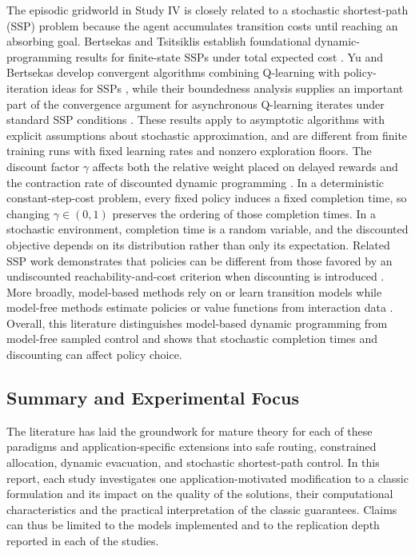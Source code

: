 \documentclass{ai-lab-report}
\begin{document}
The episodic gridworld in Study IV is closely related to a stochastic shortest-path (SSP) problem because the agent accumulates transition costs until reaching an absorbing goal. Bertsekas and Tsitsiklis establish foundational dynamic-programming results for finite-state SSPs under total expected cost \citep{bertsekas1991ssp}. Yu and Bertsekas develop convergent algorithms combining Q-learning with policy-iteration ideas for SSPs \citep{yu2013qlearning}, while their boundedness analysis supplies an important part of the convergence argument for asynchronous Q-learning iterates under standard SSP conditions \citep{yu2013boundedness}. These results apply to asymptotic algorithms with explicit assumptions about stochastic approximation, and are different from finite training runs with fixed learning rates and nonzero exploration floors. The discount factor $\gamma$ affects both the relative weight placed on delayed rewards and the contraction rate of discounted dynamic programming \citep{sutton2018rl}. In a deterministic constant-step-cost problem, every fixed policy induces a fixed completion time, so changing $\gamma \in (0,1)$ preserves the ordering of those completion times. In a stochastic environment, completion time is a random variable, and the discounted objective depends on its distribution rather than only its expectation. Related SSP work demonstrates that policies can be different from those favored by an undiscounted reachability-and-cost criterion when discounting is introduced \citep{teichteil2012stochastic}. More broadly, model-based methods rely on or learn transition models while model-free methods estimate policies or value functions from interaction data \citep{moerland2023modelbased}. Overall, this literature distinguishes model-based dynamic programming from model-free sampled control and shows that stochastic completion times and discounting can affect policy choice.

\subsection{Summary and Experimental Focus}

The literature has laid the groundwork for mature theory for each of these paradigms and application-specific extensions into safe routing, constrained allocation, dynamic evacuation, and stochastic shortest-path control. In this report, each study investigates one application-motivated modification to a classic formulation and its impact on the quality of the solutions, their computational characteristics and the practical interpretation of the classic guarantees. Claims can thus be limited to the models implemented and to the replication depth reported in each of the studies.
\end{document}
